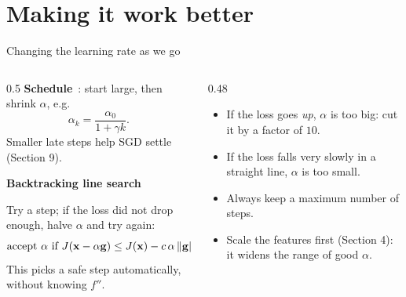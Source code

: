 \section{Making it work better}

\begin{frame}{Changing the learning rate as we go}
  \begin{columns}[T]
    \begin{column}{0.5\textwidth}
      \small
      \textbf{Schedule}~\cite{bottou2018}: start large, then shrink $\alpha$, e.g.
      \[
        \alpha_k = \frac{\alpha_0}{1 + \gamma k}.
      \]
      Smaller late steps help SGD settle (Section 9).

      \vspace{4pt}
      \textbf{Backtracking line search}~\cite{armijo1966}
      \par\footnotesize Try a step; if the loss did not drop enough, halve $\alpha$ and try again:
      \[
        \text{accept }\alpha\text{ if } J(\mathbf{x} - \alpha\mathbf{g}) \le J(\mathbf{x}) - c\,\alpha\left\lVert \mathbf{g} \right\rVert^2 .
      \]
      This picks a safe step automatically, without knowing $f''$.
    \end{column}
    \begin{column}{0.48\textwidth}
      \begin{thmbox}
        \small
        \begin{itemize}
          \item If the loss goes \emph{up}, $\alpha$ is too big: cut it by a factor of $10$.
          \item If the loss falls very slowly in a straight line, $\alpha$ is too small.
          \item Always keep a maximum number of steps.
          \item Scale the features first (Section 4): it widens the range of good $\alpha$.
        \end{itemize}
      \end{thmbox}
    \end{column}
  \end{columns}
\end{frame}

